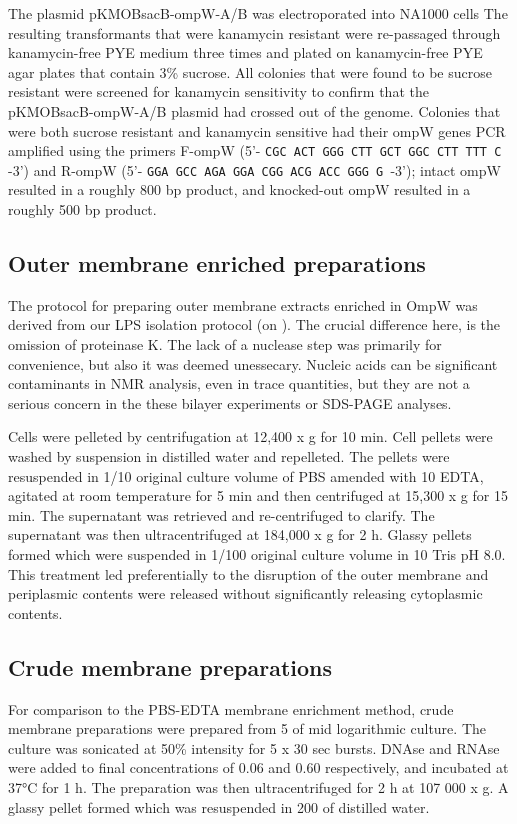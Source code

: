 The plasmid pKMOBsacB-ompW-A/B was electroporated into \caulobacter NA1000 cells The resulting transformants that were kanamycin resistant were re-passaged through kanamycin-free \ac{PYE} medium three times and plated on kanamycin-free \ac{PYE} agar plates that contain 3\% sucrose. All colonies that were found to be sucrose resistant were screened for kanamycin sensitivity to confirm that the pKMOBsacB-ompW-A/B plasmid had crossed out of the genome. Colonies that were both sucrose resistant and kanamycin sensitive had their ompW genes \ac{PCR} amplified using the primers F-ompW (5'- \texttt{CGC ACT GGG CTT GCT GGC CTT TTT C }-3') and R-ompW (5'- \texttt{GGA GCC AGA GGA CGG ACG ACC GGG G }-3'); intact ompW resulted in a roughly 800 bp product, and knocked-out ompW resulted in a roughly 500 bp product.


\subsection{Outer membrane enriched preparations}
\label{sub:porin_omp_prep}
The protocol for preparing outer membrane extracts enriched in OmpW was derived from our \ac{LPS} isolation protocol (on ). The crucial difference here, is the omission of proteinase K. The lack of a nuclease step was primarily for convenience, but also it was deemed unessecary. Nucleic acids can be significant contaminants in \ac{NMR} analysis, even in trace quantities, but they are not a serious concern in the these bilayer  experiments or \ac{SDS-PAGE} analyses.

Cells were pelleted by centrifugation at 12,400 x g for 10 min. Cell pellets were washed by suspension in distilled water and repelleted. The pellets were resuspended in 1/10 original culture volume of \ac{PBS} amended with 10 \millimolar{} \ac{EDTA}, agitated at room temperature for 5 min and then centrifuged at 15,300 x g for 15 min. The supernatant was retrieved and re-centrifuged to clarify. The supernatant was then ultracentrifuged at 184,000 x g for 2 h. Glassy pellets formed which were suspended in 1/100 original culture volume in 10 \millimolar Tris pH 8.0. This treatment led preferentially to the disruption of the outer membrane and periplasmic contents were released without significantly releasing cytoplasmic contents.

\subsection{Crude membrane preparations}
    \label{sub:porin_crude_preps}
    For comparison to the \ac{PBS}-\ac{EDTA} membrane enrichment method, crude membrane preparations were prepared from 5 \millilitre of mid logarithmic culture. The culture was sonicated at 50\% intensity for 5 x 30 sec bursts. DNAse and RNAse were added to final concentrations of 0.06 \mgperml and 0.60 \mgperml respectively, and incubated at 37\si{\degreeCelsius} for 1 h. The preparation was then ultracentrifuged for 2 h at 107 000 x g. A glassy pellet formed which was resuspended in 200 \microlitre of distilled water.

